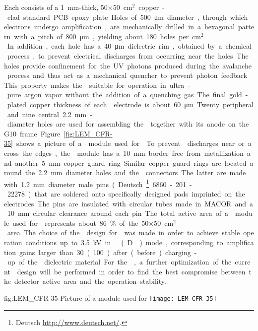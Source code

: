 Each  consists of a \SI{1}{mm}-thick,  \num{50}$\times$\SI{50}{cm$^{2}$} copper-clad standard PCB epoxy plate. Holes of \SI{500}{\micro\meter} diameter, through which electrons undergo amplification, are mechanically drilled in a hexagonal pattern with a pitch of \SI{800}{\micro\meter}, yielding about \num{180} holes per \si{cm$^2$}. In addition, each hole has a  \SI{40}{\micro\meter} dielectric rim, obtained by a chemical process, to prevent electrical discharges from occurring near the holes. The holes provide confinement for the UV photons produced during the avalanche process and thus act as a mechanical quencher to prevent photon feedback. This property makes the  suitable for operation in ultra-pure argon vapor without the addition of a quenching gas. The final gold-plated copper thickness of each  electrode is about  \SI{60}{\micro\meter}. Twenty peripheral and nine central \SI{2.2}{mm}-diameter holes are used for assembling the   together with its anode on the G10 frame. Figure~\ref{fig:LEM_CFR-35} shows a picture of a  module used for  . To prevent  discharges near or across the edges, the  module has a  \SI{10}{mm} border free from metallization and another \SI{5}{mm} copper guard ring. Similar copper guard rings are located around the \SI{2.2}{mm} diameter holes and the  connectors. The latter are made with \SI{1.2}{mm} diameter male pins (Deutsch\footnote{Deutsch\texttrademark{} \url{http://www.deutsch.net/}.} 6860-201-22278.) that are soldered onto specifically designed pads imprinted on the  electrodes. The pins are insulated with circular tubes made in MACOR and a  \SI{10}{mm} circular clearance around each pin. 

The total active area of a  module used for   represents about \SI{86}{\%} of the \num{50}$\times$\SI{50}{cm$^{2}$} area. The choice of the  design for   was made in order to achieve stable operation conditions up to \SI{3.5}{kV} in \dual \lar (D\lar{}) mode, corresponding to amplification gains larger than \num{30} (\num{100}) after (before) charging-up of the  dielectric material. For the , a further optimization of the current  design will  be performed in order  to find the best compromise between the detector active area and the operation stability.

\begin{dunefigure}
{fig:LEM_CFR-35}
{Picture of a  module used for  }
\texttt{[image: LEM\_CFR-35]}
\end{dunefigure}


